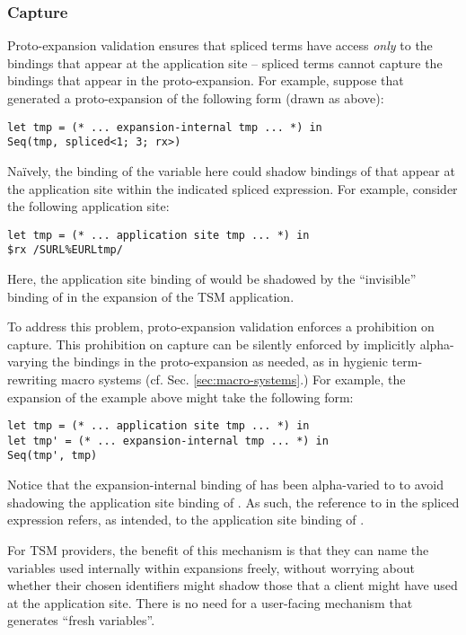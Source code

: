 \subsubsection{Capture}
Proto-expansion validation ensures that spliced terms have access \emph{only} to the bindings that appear at the application site -- spliced terms cannot capture the bindings that appear in the proto-expansion. For example, suppose that   generated a proto-expansion of the following  form (drawn as above):
\begin{lstlisting}[numbers=none]
let tmp = (* ... expansion-internal tmp ... *) in 
Seq(tmp, spliced<1; 3; rx>)
\end{lstlisting}
Na\"ively, the binding of the variable  here could shadow bindings of  that appear at the application site within the indicated spliced expression. For example, consider the following application site:
\begin{lstlisting}[numbers=none]
let tmp = (* ... application site tmp ... *) in 
$rx /SURL%EURLtmp/
\end{lstlisting}
Here, the application site binding of  would be shadowed by the ``invisible'' binding of  in the expansion of the TSM application. %

To address this problem, proto-expansion validation enforces a prohibition on capture. This prohibition on capture can be silently enforced by implicitly alpha-varying the bindings in the proto-expansion as needed, as in hygienic term-rewriting macro systems (cf. Sec. \ref{sec:macro-systems}.) For example, the expansion of the example above might take the following form:
\begin{lstlisting}[numbers=none]
let tmp = (* ... application site tmp ... *) in 
let tmp' = (* ... expansion-internal tmp ... *) in 
Seq(tmp', tmp)
\end{lstlisting}
Notice that the expansion-internal binding of  has been alpha-varied to  to avoid shadowing the application site binding of . As such, the reference to  in the spliced expression refers, as intended, to the application site binding of .

For TSM providers, the benefit of this mechanism is that they can name the variables used internally within expansions freely, without worrying about whether their chosen identifiers might shadow those that a client might have used at the application site. There is no need for a user-facing mechanism that generates ``fresh variables''.

